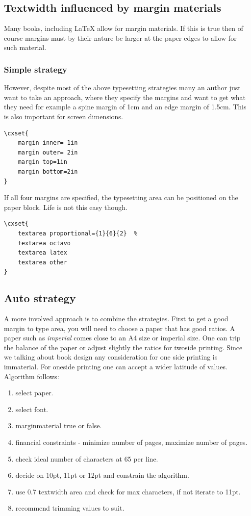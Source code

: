 \subsection{Textwidth influenced by margin materials}

Many books, including LaTeX allow for margin materials. If this is true then of course margins must by their nature be larger at the paper edges to allow for such material. 

\subsubsection{Simple strategy}
However, despite most of the above typesetting strategies many an author just want to take an approach, where they specify the margins and want to get what they need for example a spine margin of 1cm and an edge margin of 1.5cm. This is also important for screen dimensions.

\begin{lstlisting}
\cxset{
    margin inner= 1in
    margin outer= 2in
    margin top=1in
    margin bottom=2in
}
\end{lstlisting}

If all four margins are specified, the typesetting area can be positioned on the paper block. Life is not this easy though.

\begin{lstlisting}
\cxset{
    textarea proportional={1}{6}{2}  %
    textarea octavo
    textarea latex
    textarea other
}
\end{lstlisting}

\subsection{Auto strategy}

A more involved approach is to combine the strategies. First to get a good margin to type area, you will need to choose a paper that has good ratios. A paper such as \textit{imperial} comes close to an A4 size or imperial size. One can trip the balance of the paper or adjust slightly the ratios for twoside printing. Since we talking about book design any consideration for one side printing is immaterial. For oneside printing one can accept a wider latitude of values. Algorithm follows:

\begin{enumerate}
\item select paper.
\item select font.
\item marginmaterial true or false.
\item financial constraints - minimize number of pages, maximize number of pages.
\item check ideal number of characters at 65 per line.
\item decide on 10pt, 11pt or 12pt and constrain the algorithm.
\item use 0.7 textwidth area and check for max characters, if not iterate to 11pt.
\item recommend trimming values to suit.
\end{enumerate}


